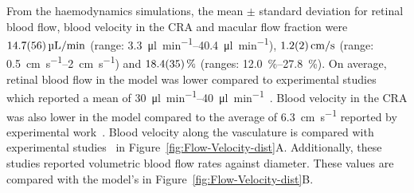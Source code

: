 \documentclass[11pt,]{article}
\begin{document}
From the haemodynamics simulations, the mean $\pm$ standard deviation for retinal blood flow, blood velocity in the CRA and macular flow fraction were $\SI[per-mode=symbol]{14.7 \pm 5.6}{\micro\litre\per\minute}$ (range: \SIrange[per-mode=symbol]{3.3}{40.4}{\micro\litre\per\minute}), $\SI[per-mode=symbol]{1.2 \pm 0.2}{\cm\per\second}$ (range: \SIrange[per-mode=symbol]{0.5}{2}{\cm\per\second}) and $\SI{18.4 \pm 3.5}{\percent}$ (ranges: \SIrange{12.0}{27.8}{\percent}).
On average, retinal blood flow in the model was lower compared to experimental studies which reported a mean of \SIrange{30}{40}{\micro\litre\per\minute}~\cite{DoblhoffDier2014,Riva1985}.
Blood velocity in the CRA was also lower in the model compared to the average of \SI{6.3}{\cm\per\second} reported by experimental work~\cite{Dorner2009}.
Blood velocity along the vasculature is compared with experimental studies~\cite{DoblhoffDier2014,Riva1985} in Figure~\ref{fig:Flow-Velocity-dist}A.
Additionally, these studies reported volumetric blood flow rates against diameter. These values are compared with the model's in Figure~\ref{fig:Flow-Velocity-dist}B. 
\end{document}
